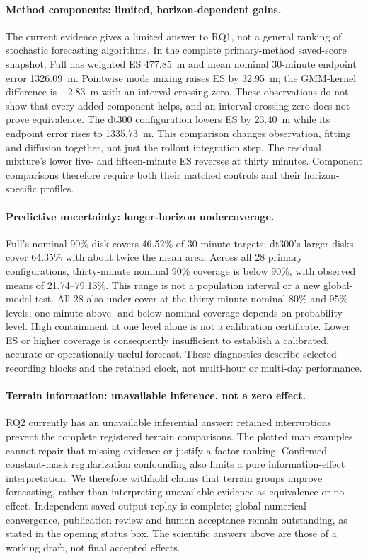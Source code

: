 \documentclass[11pt]{article}
\begin{document}
\paragraph{Method components: limited, horizon-dependent gains.}
The current evidence gives a limited answer to RQ1, not a general ranking
of stochastic forecasting algorithms. In the complete primary-method
saved-score snapshot, Full has weighted ES 477.85~m and mean nominal
30-minute endpoint error 1326.09~m. Pointwise mode mixing raises ES by
32.95~m; the GMM-kernel difference is $-2.83$~m with an interval crossing
zero. These observations do not show that every added component helps,
and an interval crossing zero does not prove equivalence. The dt300
configuration lowers ES by 23.40~m while its endpoint error rises to
1335.73~m. This comparison changes observation, fitting and diffusion
together, not just the rollout integration step. The residual mixture's
lower five- and fifteen-minute ES reverses at thirty minutes. Component
comparisons therefore require both their matched controls and their
horizon-specific profiles.

\paragraph{Predictive uncertainty: longer-horizon undercoverage.}
Full's nominal 90\% disk covers 46.52\% of 30-minute targets; dt300's
larger disks cover 64.35\% with about twice the mean area. Across all 28
primary configurations, thirty-minute nominal 90\% coverage is below 90\%,
with observed means of 21.74--79.13\%. This range is not a population
interval or a new global-model test. All 28 also under-cover at the
thirty-minute nominal 80\% and 95\% levels; one-minute above- and
below-nominal coverage depends on probability level. High containment at
one level alone is not a calibration certificate. Lower ES or higher
coverage is consequently insufficient to establish a calibrated, accurate
or operationally useful forecast. These diagnostics describe selected
recording blocks and the retained clock, not multi-hour or multi-day
performance.

\paragraph{Terrain information: unavailable inference, not a zero effect.}
RQ2 currently has an unavailable inferential answer: retained interruptions
prevent the complete registered terrain comparisons. The plotted map
examples cannot repair that missing evidence or justify a factor ranking.
Confirmed constant-mask regularization confounding also limits a pure
information-effect interpretation. We therefore withhold claims that terrain
groups improve forecasting, rather than interpreting unavailable evidence
as equivalence or no effect. Independent saved-output replay is complete;
global numerical convergence, publication review and human acceptance remain
outstanding, as stated in the opening status box.
The scientific answers above are those of a working draft, not final
accepted effects.
\end{document}
